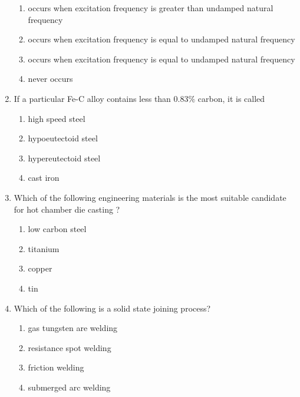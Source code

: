 \documentclass[journal]{IEEEtran}
\begin{document}
\begin{enumerate}
\begin{enumerate}
        \item occurs when excitation frequency is greater than undamped natural frequency
        \item occurs when excitation frequency is equal to undamped natural frequency
        \item occurs when excitation frequency is equal to undamped natural frequency
        \item never occurs
\end{enumerate}

\bigskip
\item If a particular Fe-C alloy contains less than $ 0.83\% $ carbon, it is called
\begin{multicols}{2}
    \begin{enumerate}
        \item high speed steel
        \item hypoeutectoid steel
        \item hypereutectoid steel
        \item cast iron
    \end{enumerate}
\end{multicols}
\bigskip
\item Which of the following engineering materials is the most suitable candidate for hot chamber die casting ?
\begin{multicols}{2}
    \begin{enumerate}
        \item low carbon steel 
        \item titanium 
        \item copper 
        \item tin
    \end{enumerate}
\end{multicols}
\bigskip
\item Which of the following is a solid state joining  process?
\begin{multicols}{2}
    \begin{enumerate}
        \item gas tungsten are welding
        \item resistance spot welding
        \item friction welding 
        \item submerged arc welding 
    \end{enumerate}
\end{multicols}

\end{enumerate}
\end{document}
